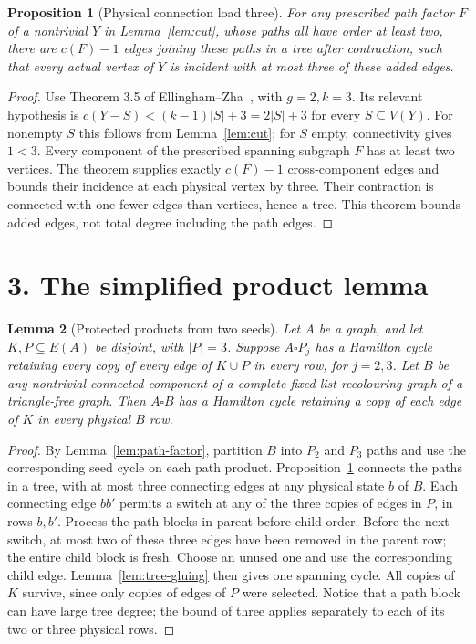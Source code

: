 \documentclass[11pt]{article}
\newtheorem{lemma}{Lemma}
\newtheorem{proposition}[lemma]{Proposition}
\theoremstyle{remark}\newtheorem{remark}[lemma]{Remark}
\begin{document}
\begin{proposition}[Physical connection load three]\label{prop:load}
For any prescribed path factor $F$ of a nontrivial $Y$ in
Lemma~\ref{lem:cut}, whose paths all have order at least two, there
are $c(F)-1$ edges joining these paths in a tree after contraction,
such that every actual vertex of $Y$ is incident with at most three
of these added edges.
\end{proposition}
\begin{proof}
Use Theorem 3.5 of Ellingham--Zha~\cite{EZ}, with $g=2,k=3$.
Its relevant hypothesis is
$c(Y-S)<(k-1)|S|+3=2|S|+3$ for every $S\subseteq V(Y)$.
For nonempty $S$ this follows from Lemma~\ref{lem:cut}; for $S$ empty,
connectivity gives $1<3$. Every component of the prescribed spanning
subgraph $F$ has at least two vertices. The theorem supplies exactly
$c(F)-1$ cross-component edges and bounds their incidence at each
physical vertex by three. Their contraction is connected with one
fewer edges than vertices, hence a tree. This theorem bounds added
edges, not total degree including the path edges.
\end{proof}

\section*{3. The simplified product lemma}

\begin{lemma}[Protected products from two seeds]\label{lem:product}
Let $A$ be a graph, and let $K,P\subseteq E(A)$ be disjoint, with
$|P|=3$. Suppose $A\square P_j$ has a Hamilton cycle retaining every
copy of every edge of $K\cup P$ in every row, for $j=2,3$.
Let $B$ be any nontrivial connected component of a complete fixed-list
recolouring graph of a triangle-free graph. Then $A\square B$ has
a Hamilton cycle retaining a copy of each edge of $K$ in every
physical $B$ row.
\end{lemma}
\begin{proof}
By Lemma~\ref{lem:path-factor}, partition $B$ into $P_2$ and $P_3$
paths and use the corresponding seed cycle on each path product.
Proposition~\ref{prop:load} connects the paths in a tree, with at
most three connecting edges at any physical state $b$ of $B$.
Each connecting edge $bb'$ permits a switch at any of the three
copies of edges in $P$, in rows $b,b'$.
Process the path blocks in parent-before-child order. Before the
next switch, at most two of these three edges have been removed
in the parent row; the entire child block is fresh. Choose an unused
one and use the corresponding child edge. Lemma~\ref{lem:tree-gluing}
then gives one spanning cycle. All copies of $K$ survive, since only
copies of edges of $P$ were selected. Notice that a path block can
have large tree degree; the bound of three applies separately to
each of its two or three physical rows.
\end{proof}
\end{document}

